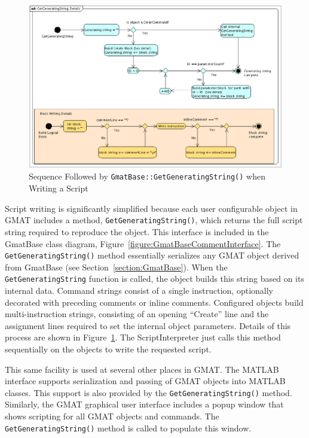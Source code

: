 \begin{figure}[htb]
\begin{center}
\includegraphics[scale=0.5]{Images/GetGeneratingStringDetails.eps}
\caption{\label{figure:ObjectGetGeneratingString}Sequence Followed by
\texttt{GmatBase::GetGeneratingString()} when Writing a Script}
\end{center}
\end{figure}

Script writing is significantly simplified because each user configurable object in GMAT includes a
method, \texttt{GetGeneratingString()}, which returns the full script string required to reproduce
the object.  This interface is included in the GmatBase class diagram,
Figure~\ref{figure:GmatBaseCommentInterface}.  The \texttt{GetGeneratingString()} method
essentially serializes any GMAT object derived from GmatBase (see
Section~\ref{section:GmatBase}).  When the \texttt{GetGeneratingString} function is called, the
object builds this string based on its internal data.  Command strings consist of a single
instruction, optionally decorated with preceding comments or inline comments.  Configured objects
build multi-instruction strings, consisting of an opening ``Create'' line and the assignment lines
required to set the internal object parameters.  Details of this process are shown in
Figure~\ref{figure:ObjectGetGeneratingString}.  The ScriptInterpreter just calls this method
sequentially on the objects to write the requested script.

This same facility is used at several other places in GMAT.  The MATLAB interface supports
serialization and passing of GMAT objects into MATLAB classes.  This support is also provided by the
\texttt{GetGeneratingString()} method.  Similarly, the GMAT graphical user interface includes a
popup window that shows scripting for all GMAT objects and commands.  The
\texttt{GetGeneratingString()} method is called to populate this window.

